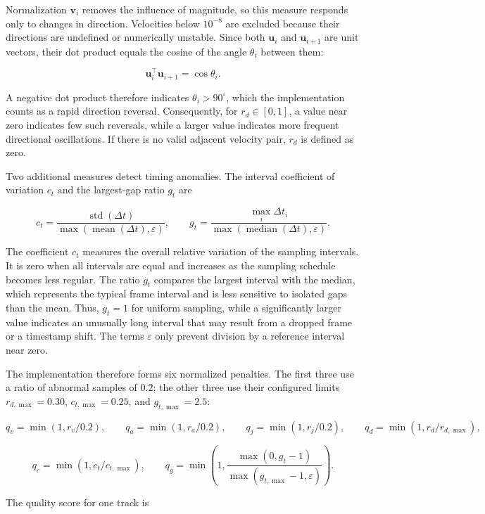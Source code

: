 \documentclass[11pt,oneside]{report}
\begin{document}
Normalization $\mathbf{v}_i$ removes the influence of magnitude, so this measure responds only to changes in direction. Velocities below $10^{-8}$ are excluded because their directions are undefined or numerically unstable. Since both $\mathbf{u}_i$ and $\mathbf{u}_{i+1}$ are unit vectors, their dot product equals the cosine of the angle $\theta_i$ between them:

\[
\mathbf{u}_i^\top\mathbf{u}_{i+1}=\cos\theta_i.
\]

A negative dot product therefore indicates $\theta_i>90^\circ$, which the implementation counts as a rapid direction reversal. Consequently, for $r_d\in[0,1]$, a value near zero indicates few such reversals, while a larger value indicates more frequent directional oscillations. If there is no valid adjacent velocity pair, $r_d$ is defined as zero.

Two additional measures detect timing anomalies. The interval coefficient of variation $c_t$ and the largest-gap ratio $g_t$ are

\[
c_t =
\frac{\operatorname{std}(\Delta t)}
{\max\!\left(\operatorname{mean}(\Delta t),\varepsilon\right)},
\qquad
g_t =
\frac{\max_i\Delta t_i}
{\max\!\left(\operatorname{median}(\Delta t),\varepsilon\right)}.
\]

The coefficient $c_t$ measures the overall relative variation of the sampling intervals. It is zero when all intervals are equal and increases as the sampling schedule becomes less regular. The ratio $g_t$ compares the largest interval with the median, which represents the typical frame interval and is less sensitive to isolated gaps than the mean. Thus, $g_t=1$ for uniform sampling, while a significantly larger value indicates an unusually long interval that may result from a dropped frame or a timestamp shift. The terms $\varepsilon$ only prevent division by a reference interval near zero.

The implementation therefore forms six normalized penalties. The first three use a ratio of abnormal samples of $0.2$; the other three use their configured limits $r_{d,\max}=0.30$, $c_{t,\max}=0.25$, and $g_{t,\max}=2.5$:

\[
q_v=\min(1,r_v/0.2),
\qquad
q_a=\min(1,r_a/0.2),
\qquad
q_j=\min(1,r_j/0.2),
\qquad
q_d=\min(1,r_d/r_{d,\max}),
\]

\[
q_c=\min(1,c_t/c_{t,\max}),
\qquad
q_g=\min\!\left(
1,
\frac{\max(0,g_t-1)}
{\max(g_{t,\max}-1,\varepsilon)}
\right).
\]

The quality score for one track is
\end{document}
